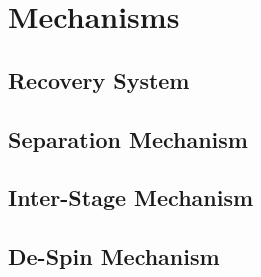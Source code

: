 \section{Mechanisms}
\subsection{Recovery System}
\subsection{Separation Mechanism}
\subsection{Inter-Stage Mechanism}
\subsection{De-Spin Mechanism}